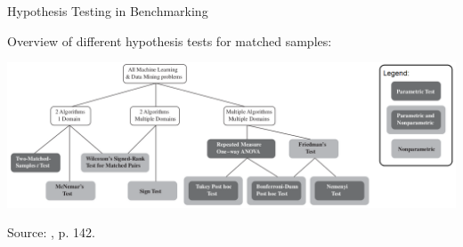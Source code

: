 \begin{vbframe}{Hypothesis Testing in Benchmarking}
%

Overview of different hypothesis tests for matched samples:

\begin{center}\includegraphics[width=\textwidth]{figure_man/tests_overview.png} \end{center}

\footnotesize
{\tiny{Source: , p. 142.}\par}

\end{vbframe}



